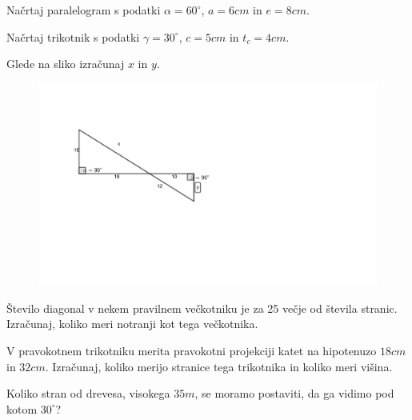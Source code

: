 \documentclass{izpit}
\begin{document}
\naloga[\tocke{5}]
  Načrtaj paralelogram s podatki $\alpha=60^\circ$, $a=6cm$ in $e=8cm$.



\naloga[\tocke{5}]
  Načrtaj trikotnik s podatki $\gamma =30^\circ$, $c=5cm$ in $t_c =4cm$.


  
\naloga[5]
  Glede na sliko izračunaj $x$ in $y$.
  \begin{figure}[H]
    \includegraphics[width=1\textwidth]{naloga_podobnost.pdf}
    \centering
\end{figure}
  \prostor[2]

\naloga*[4]
  Število diagonal v nekem pravilnem večkotniku je za 25 večje od števila stranic. Izračunaj, koliko meri notranji kot tega večkotnika.
  \prostor[1.5]


\naloga[\tocke{4}]
  V pravokotnem trikotniku merita pravokotni projekciji katet na hipotenuzo $18cm$ in $32cm$. Izračunaj, koliko merijo stranice tega trikotnika in koliko meri višina.
  \prostor[1]

\naloga*[\tocke{3}]
  Koliko stran od drevesa, visokega $35m$, se moramo postaviti, da ga vidimo pod kotom $30^\circ$?
  \prostor[1]
\end{document}
